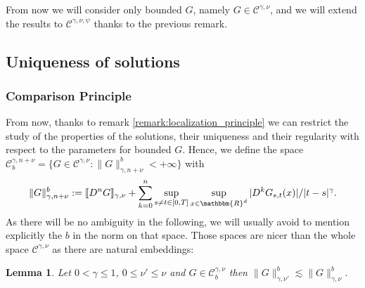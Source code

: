 \documentclass[a4paper,11pt]{article}
\newcommand{\assign}{:=}
\newtheorem{lemma}[theorem]{Lemma}
\newcommand{\CC}{\mathscr C}
\begin{document}
From now we will consider only bounded $G$, namely $G \in \CC^{\gamma , \nu}$,
and we will extend the results to $\CC^{\gamma , \nu , \psi}$ thanks to the
previous remark.

\subsection{Uniqueness of solutions}\label{subsec:uniqueness}

\subsubsection{Comparison Principle}\label{subsec:comparison_principle}

From now, thanks to remark \ref{remark:localization_principle} we can restrict
the study of the properties of the solutions, their uniqueness and their
regularity with respect to the parameters for bounded $G$. Hence, we define the
 space
$ \CC^{\gamma ,n+ \nu}_{b} = \{ G \in \CC^{\gamma , \nu} : \| G
   \|^{b}_{\gamma ,n+ \nu} <+ \infty
   \} $
   with $$
   \| G
   \|^{b}_{\gamma ,n+ \nu} \assign \llbracket D^{n} G \rrbracket_{\gamma ,
   \nu} + \sum_{k=0}^{n} \sup_{s \neq t \in [ 0,T ]} \sup_{x \in
   \mathbbm{R}^{d}} | D^{k} G_{s,t} ( x ) | / | t-s |^{\gamma}.
   $$
As there will be no ambiguity in the following, we will usually avoid to
mention explicitly the $b$ in the norm on that space. Those spaces are nicer
than the whole space $\CC^{\gamma , \nu}$ as there are natural embeddings:

\begin{lemma}
  \label{lemma:embedding}Let $0< \gamma \leqslant 1$, $0 \leqslant
  \nu' \leqslant \nu$ and $G \in \CC^{\gamma , \nu}_{b}$ then
  $ \| G \|^{b}_{\gamma , \nu'} \lesssim \| G \|_{\gamma , \nu}^{b} $.
  \end{lemma}
\end{document}
